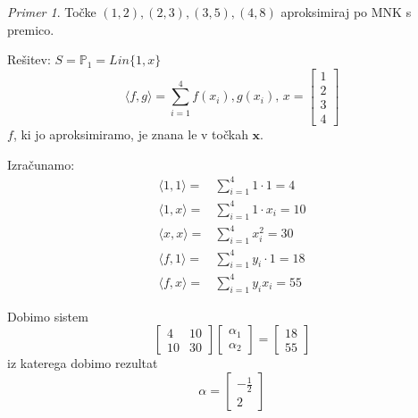 \documentclass[a4paper,12pt]{article}
\newcommand{\innerproduct}[2]{\langle #1, #2 \rangle}
\theoremstyle{definition}
\theoremstyle{remark}
\newtheorem*{ex}{Primer}
\newcommand{\Pp}{\mathbb{P}}
\begin{document}
\begin{ex}
    Točke $(1, 2), (2, 3), (3, 5), (4, 8)$ aproksimiraj po MNK s premico.

    Rešitev:
    $S = \Pp_1 = Lin\{1, x\}$
    \begin{equation*}
        \innerproduct{f}{g} = \sum_{i = 1}^{4} f(x_i), g(x_i) \text{, } x =
        \begin{bmatrix}
            1 \\
            2 \\
            3 \\
            4
        \end{bmatrix}
    \end{equation*}
    $f$, ki jo aproksimiramo, je znana le v točkah $\textbf{x}$.

    Izračunamo:
    \begin{align*}
        \innerproduct{1}{1} =& \sum_{i = 1}^{4}1\cdot 1 = 4 \\
        \innerproduct{1}{x} =& \sum_{i = 1}^{4}1\cdot x_i = 10 \\
        \innerproduct{x}{x} =& \sum_{i = 1}^{4}x_i^2 = 30 \\
        \innerproduct{f}{1} =& \sum_{i = 1}^{4} y_i \cdot 1 = 18 \\
        \innerproduct{f}{x} =& \sum_{i = 1}^{4} y_i x_i = 55
    \end{align*}

    Dobimo sistem
    \begin{equation*}
        \begin{bmatrix}
            4 & 10 \\
            10 & 30
        \end{bmatrix}
        \begin{bmatrix}
            \alpha_1 \\
            \alpha_2
        \end{bmatrix}
        =
        \begin{bmatrix}
            18 \\
            55
        \end{bmatrix}
    \end{equation*}
    iz katerega dobimo rezultat
    \[ \alpha = 
        \begin{bmatrix}
            -\frac{1}{2} \\
            2
        \end{bmatrix}\]


\end{ex}
\end{document}
